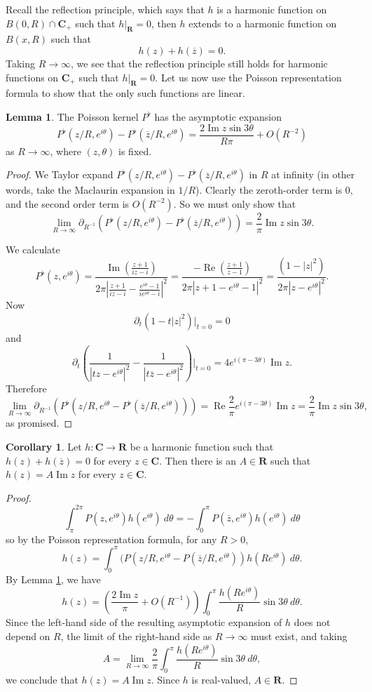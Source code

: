 \documentclass[12pt]{report}
\newcommand{\RR}{\mathbf{R}}
\newcommand{\CC}{\mathbf{C}}
\renewcommand{\Re}{\operatorname{Re}}
\renewcommand{\Im}{\operatorname{Im}}
\theoremstyle{definition}
\newtheorem{lemma}[theorem]{Lemma}
\newtheorem{corollary}[theorem]{Corollary}
\begin{document}
Recall the reflection principle, which says that $h$ is a harmonic function on $B(0, R) \cap \CC_+$ such that $h|_\RR = 0$, then $h$ extends to a harmonic function on $B(x, R)$ such that
$$h(z) + h(\overline z) = 0.$$
Taking $R \to \infty$, we see that the reflection principle still holds for harmonic functions on $\CC_+$ such that $h|_\RR = 0$. Let us now use the Poisson representation formula to show that the only such functions are linear.
\begin{lemma}
\label{asymptotics for the poisson kernel}
The Poisson kernel $P^\flat$ has the asymptotic expansion
$$P^\flat(z/R, e^{i\theta}) - P^\flat(\overline z/R, e^{i\theta}) = \frac{2\Im z \sin 3\theta}{R\pi} + O(R^{-2})$$
as $R \to \infty$, where $(z, \theta)$ is fixed.
\end{lemma}
\begin{proof}
We Taylor expand $P^\flat(z/R, e^{i\theta}) - P^\flat(\overline z/R, e^{i\theta})$ in $R$ at infinity (in other words, take the Maclaurin expansion in $1/R$). Clearly the zeroth-order term is $0$, and the second order term is $O(R^{-2})$. So we must only show that
$$\lim_{R \to \infty} \partial_{R^{-1}}(P^\flat(z/R, e^{i\theta}) - P^\flat(\overline z/R, e^{i\theta})) = \frac{2}{\pi} \Im z \sin 3\theta.$$

We calculate
$$P^\flat(z, e^{i\theta}) = \frac{\Im\left(\frac{z+1}{iz-i}\right)}{2\pi\left|\frac{z+1}{iz-i} - \frac{e^{i\theta} - 1}{ie^{i\theta} -i}\right|^2}
  = \frac{-\Re\left(\frac{z+1}{z-1}\right)}{2\pi|z + 1 - e^{i\theta} - 1|^2} = \frac{(1 - |z|^2)}{2\pi|z - e^{i\theta}|^2}.$$
Now
$$\partial_t (1 - t|z|^2)|_{t=0} = 0$$
and
$$\partial_t \left(\frac{1}{|tz - e^{i\theta}|^2} - \frac{1}{|t\overline z - e^{i\theta}|^2}\right)|_{t = 0} = 4e^{i(\pi - 3\theta)}\Im z.$$
Therefore
$$\lim_{R \to \infty} \partial_{R^{-1}}(P^\flat(z/R, e^{i\theta} - P^\flat(\overline z/R, e^{i\theta}))) = \Re \frac{2}{\pi}e^{i(\pi - 3\theta)}\Im z = \frac{2}{\pi} \Im z \sin 3\theta,$$
as promised.
\end{proof}
\begin{corollary}
\label{reflected harmonics are linear}
Let $h: \CC \to \RR$ be a harmonic function such that $h(z) + h(\overline z) = 0$ for every $z \in \CC$. Then there is an $A \in \RR$ such that $h(z) = A \Im z$ for every $z \in \CC$.
\end{corollary}
\begin{proof}
  $$\int_\pi^{2\pi} P(z, e^{i\theta})h(e^{i\theta}) ~d\theta = -\int_0^\pi P(\overline z, e^{i\theta})h(e^{i\theta}) ~d\theta$$
  so by the Poisson representation formula, for any $R > 0$,
  $$h(z) = \int_0^\pi (P(z/R, e^{i\theta} - P(\overline z/R, e^{i\theta}))h(Re^{i\theta})~d\theta.$$
  By Lemma \ref{asymptotics for the poisson kernel}, we have
  $$h(z) = \left(\frac{2\Im z}{\pi} + O(R^{-1})\right)\int_0^\pi \frac{h(Re^{i\theta})}{R}\sin 3\theta ~d\theta.$$
  Since the left-hand side of the resulting asymptotic expansion of $h$ does not depend on $R$, the limit of the right-hand side as $R \to \infty$ must exist, and taking
  $$A = \lim_{R \to \infty} \frac{2}{\pi}\int_0^\pi \frac{h(Re^{i\theta})}{R}\sin 3\theta ~d\theta,$$
  we conclude that $h(z) = A\Im z$. Since $h$ is real-valued, $A \in \RR$.
\end{proof}
\end{document}
